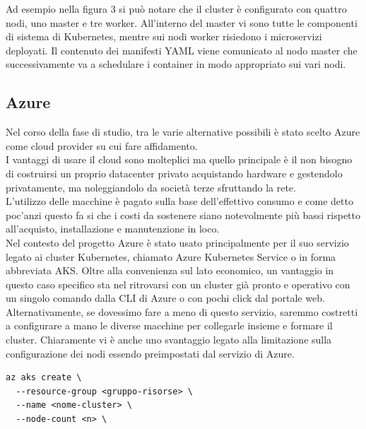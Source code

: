 \documentclass[a4paper,12pt]{report}
\begin{document}
Ad esempio nella figura 3 si può notare che il cluster è configurato con quattro nodi, uno master e tre worker. All'interno del master vi sono tutte le componenti di sistema di Kubernetes, mentre sui nodi worker risiedono i microservizi deployati. Il contenuto dei manifesti YAML viene comunicato al nodo master che successivamente va a schedulare i container in modo appropriato sui vari nodi.
\subsection{Azure}
Nel corso della fase di studio, tra le varie alternative possibili è stato scelto Azure come cloud provider su cui fare affidamento.\\
I vantaggi di usare il cloud sono molteplici ma quello principale è il non bisogno di costruirsi un proprio datacenter privato acquistando hardware e gestendolo privatamente, ma noleggiandolo da società terze sfruttando la rete.\cite{cloud}\\
L'utilizzo delle macchine è pagato sulla base dell'effettivo consumo e come detto poc'anzi questo fa si che i costi da sostenere siano notevolmente più bassi rispetto all'acquisto, installazione e manutenzione in loco.\\
Nel contesto del progetto Azure è stato usato principalmente per il suo servizio legato ai cluster Kubernetes, chiamato Azure Kubernetes Service o in forma abbreviata AKS. Oltre alla convenienza sul lato economico, un vantaggio in questo caso specifico sta nel ritrovarsi con un cluster già pronto e operativo con un singolo comando dalla CLI di Azure o con pochi click dal portale web.\\
Alternativamente, se dovessimo fare a meno di questo servizio, saremmo costretti a configurare a mano le diverse macchine per collegarle insieme e formare il cluster. Chiaramente vi è anche uno svantaggio legato alla limitazione sulla configurazione dei nodi essendo preimpostati dal servizio di Azure.
\begin{lstlisting}[caption={\\\textit{Esempio di comando per creare un cluster Kubernetes come servizio di Azure da Azure CLI. Gli argomenti passati sono il gruppo risorse in cui deployare la risorsa di tipo AKS, il nome attribuito al cluster e il numero di nodi desiderati.}}]
az aks create \
  --resource-group <gruppo-risorse> \
  --name <nome-cluster> \
  --node-count <n> \
\end{lstlisting}
\end{document}
